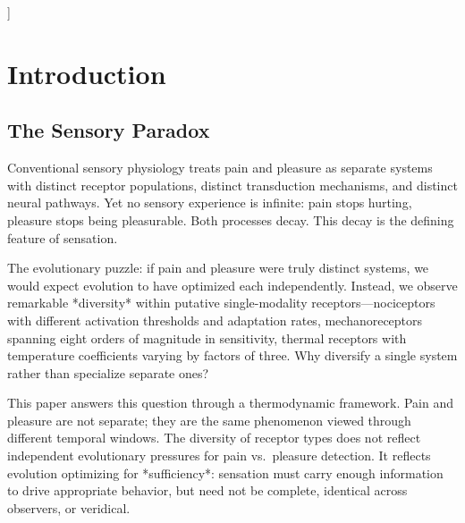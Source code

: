 \documentclass[twocolumn,10pt]{article}
\theoremstyle{remark}
\begin{document}
\begin{@twocolumnfalse}
\begin{abstract}
ion-transport measurement, pharmacological manipulation of time constants, skill-acquisition studies measuring emotional context remapping, and deafferentation analogues in circuit topologies.

\vspace{6pt}
\noindent\textbf{Keywords:} sensation mechanics, temporal decay kinetics, closed microfluidic circuits, charge redistribution, receptor diversity, sufficiency principle, time constant heterogeneity, pain-pleasure equivalence, substrate-neutral thoughts, emotional context, deafferentation paradox, circuit closure, skill acquisition, context remapping, behavioral response urgency, conscious control
  \end{abstract}
  \vspace{12pt}
  \end{@twocolumnfalse}
]

\section{Introduction}
\label{sec:intro}

\subsection{The Sensory Paradox}

Conventional sensory physiology treats pain and pleasure as separate systems with distinct receptor populations, distinct transduction mechanisms, and distinct neural pathways. Yet no sensory experience is infinite: pain stops hurting, pleasure stops being pleasurable. Both processes decay. This decay is the defining feature of sensation.

The evolutionary puzzle: if pain and pleasure were truly distinct systems, we would expect evolution to have optimized each independently. Instead, we observe remarkable *diversity* within putative single-modality receptors---nociceptors with different activation thresholds and adaptation rates, mechanoreceptors spanning eight orders of magnitude in sensitivity, thermal receptors with temperature coefficients varying by factors of three. Why diversify a single system rather than specialize separate ones?

This paper answers this question through a thermodynamic framework. Pain and pleasure are not separate; they are the same phenomenon viewed through different temporal windows. The diversity of receptor types does not reflect independent evolutionary pressures for pain vs.\ pleasure detection. It reflects evolution optimizing for *sufficiency*: sensation must carry enough information to drive appropriate behavior, but need not be complete, identical across observers, or veridical.
\end{document}
